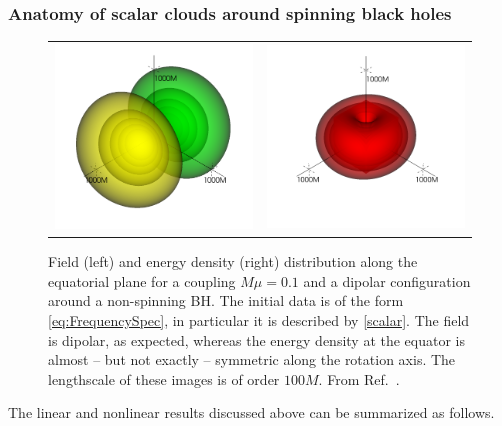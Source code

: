 \documentclass[11pt]{article}
\numberwithin{equation}{section} %
\begin{document}
\subsubsection{Anatomy of scalar clouds around spinning black holes}\label{sec:cloudproperties}
%
\begin{figure}[htb]
\begin{tabular}{cc}
\includegraphics[width=7cm]{Phi_Mc0_a0_mu01.png}&
\includegraphics[width=7cm]{rho_Mc0_a0_mu01.png}
\end{tabular}
\caption{Field (left) and energy density (right) distribution along the equatorial plane for a coupling $M\mu=0.1$ and a dipolar configuration around a non-spinning BH. The initial data is of the form \eqref{eq:FrequencySpec}, in particular it is described by
\eqref{scalar}. The field is dipolar, as expected, whereas the energy density at the equator is almost -- but not exactly -- symmetric along the rotation axis. The lengthscale of these images is of order $100M$. From Ref.~\cite{Cardoso:2020hca}.
\label{fig:a0_Mc0_mu01_snapshot}
}
\end{figure}
%
The linear and nonlinear results discussed above can be summarized as follows.
\end{document}

